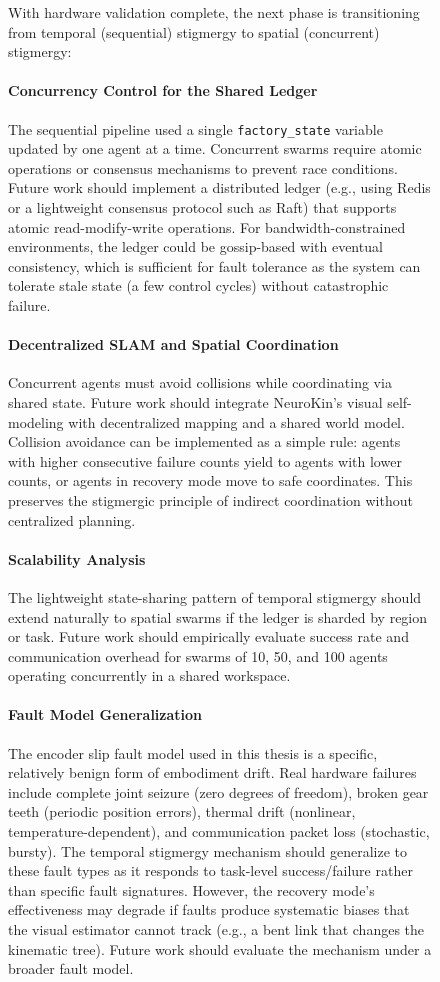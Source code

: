 \documentclass[12pt,a4paper,oneside]{report}
\begin{document}
\begin{figure}[H]
With hardware validation complete, the next phase is transitioning from temporal (sequential) stigmergy to spatial (concurrent) stigmergy:

\paragraph{Concurrency Control for the Shared Ledger}
The sequential pipeline used a single \texttt{factory\_state} variable updated by one agent at a time. Concurrent swarms require atomic operations or consensus mechanisms to prevent race conditions. Future work should implement a distributed ledger (e.g., using Redis or a lightweight consensus protocol such as Raft) that supports atomic read-modify-write operations. For bandwidth-constrained environments, the ledger could be gossip-based with eventual consistency, which is sufficient for fault tolerance as the system can tolerate stale state (a few control cycles) without catastrophic failure.

\paragraph{Decentralized SLAM and Spatial Coordination}
Concurrent agents must avoid collisions while coordinating via shared state. Future work should integrate NeuroKin's visual self-modeling with decentralized mapping and a shared world model. Collision avoidance can be implemented as a simple rule: agents with higher consecutive failure counts yield to agents with lower counts, or agents in recovery mode move to safe coordinates. This preserves the stigmergic principle of indirect coordination without centralized planning.

\paragraph{Scalability Analysis}
The lightweight state-sharing pattern of temporal stigmergy should extend naturally to spatial swarms if the ledger is sharded by region or task. Future work should empirically evaluate success rate and communication overhead for swarms of 10, 50, and 100 agents operating concurrently in a shared workspace.

\paragraph{Fault Model Generalization}
The encoder slip fault model used in this thesis is a specific, relatively benign form of embodiment drift. Real hardware failures include complete joint seizure (zero degrees of freedom), broken gear teeth (periodic position errors), thermal drift (nonlinear, temperature-dependent), and communication packet loss (stochastic, bursty). The temporal stigmergy mechanism should generalize to these fault types as it responds to task-level success/failure rather than specific fault signatures. However, the recovery mode's effectiveness may degrade if faults produce systematic biases that the visual estimator cannot track (e.g., a bent link that changes the kinematic tree). Future work should evaluate the mechanism under a broader fault model.


\end{figure}
\end{document}
